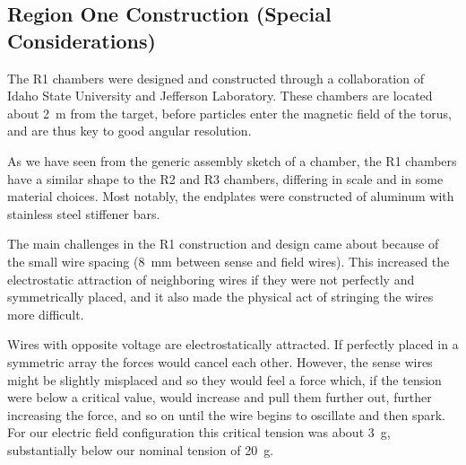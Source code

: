 \subsection{Region One Construction (Special Considerations)}

The R1 chambers were designed and constructed through a collaboration 
of Idaho State University and Jefferson Laboratory.  These 
chambers are located about 2~m from the target, 
before particles enter the magnetic field of the torus,
and are thus key to good angular resolution. 

As we have seen from the generic assembly sketch of a chamber, the R1
chambers have a similar shape to the R2 and R3 chambers, differing in
scale and in some material choices.
Most notably, the endplates were constructed of aluminum with stainless
steel stiffener bars.

The main challenges in the R1 construction and design came about because
of the small wire spacing (8~mm between sense and field wires).  This
increased the electrostatic attraction of neighboring wires if they were
not perfectly and symmetrically placed, and it also made the physical act
of stringing the wires more difficult.

Wires with opposite voltage are electrostatically attracted.  If perfectly
placed in a symmetric array the forces would cancel each other. 
However, the sense wires might be slightly misplaced and so they would feel
a force which, if the tension were below a critical value, would increase
and pull them further out, further increasing the force, and so on until 
the wire begins to oscillate and then spark.  For our electric field configuration
this critical tension was about 3~g, substantially below our nominal
tension of 20~g.

